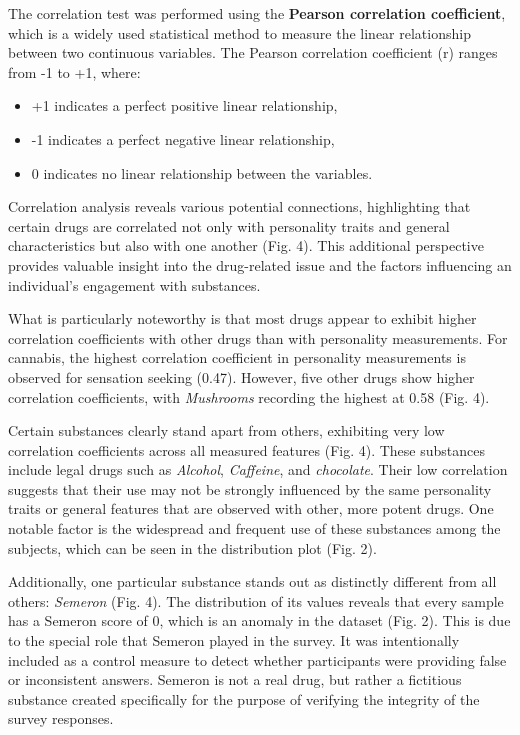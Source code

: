 \documentclass{article}
\begin{document}
\newpage

The correlation test was performed using the \textbf{Pearson correlation coefficient}, which is a widely used statistical method to measure the linear relationship between two continuous variables. The Pearson correlation coefficient (r) ranges from -1 to +1, where:
\begin{itemize}
   \item +1 indicates a perfect positive linear relationship,
    \item -1 indicates a perfect negative linear relationship,
    \item 0 indicates no linear relationship between the variables.
\end{itemize}

\hspace{1cm}Correlation analysis reveals various potential connections, highlighting that certain drugs are correlated not only with personality traits and general characteristics but also with one another (Fig. 4). This additional perspective provides valuable insight into the drug-related issue and the factors influencing an individual's engagement with substances.

What is particularly noteworthy is that most drugs appear to exhibit higher correlation coefficients with other drugs than with personality measurements. For cannabis, the highest correlation coefficient in personality measurements is observed for sensation seeking (0.47). However, five other drugs show higher correlation coefficients, with \textit{Mushrooms} recording the highest at 0.58 (Fig. 4).

\hspace{1cm}Certain substances clearly stand apart from others, exhibiting very low correlation coefficients across all measured features (Fig. 4). These substances include legal drugs such as \textit{Alcohol}, \textit{Caffeine}, and \textit{chocolate}. Their low correlation suggests that their use may not be strongly influenced by the same personality traits or general features that are observed with other, more potent drugs. One notable factor is the widespread and frequent use of these substances among the subjects, which can be seen in the distribution plot (Fig. 2). 

Additionally, one particular substance stands out as distinctly different from all others: \textit{Semeron} (Fig. 4). The distribution of its values reveals that every sample has a Semeron score of 0, which is an anomaly in the dataset (Fig. 2). This is due to the special role that Semeron played in the survey. It was intentionally included as a control measure to detect whether participants were providing false or inconsistent answers. Semeron is not a real drug, but rather a fictitious substance created specifically for the purpose of verifying the integrity of the survey responses. 
\end{document}
